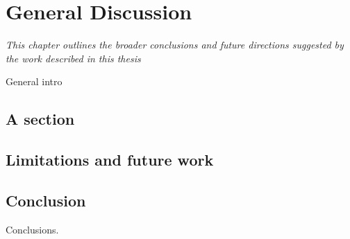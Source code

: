 \chapter{General Discussion}
\label{ch:Discussion}
\textit{This chapter outlines the broader conclusions and future directions suggested by the work described in this thesis}

\startcontents[chapters]{\vspace{-1.4cm}}
\singlespacing
{}
\doublespacing
\vspace{0.5cm}

General intro

\section{A section}

\section{Limitations and future work}

\section{Conclusion}

Conclusions.